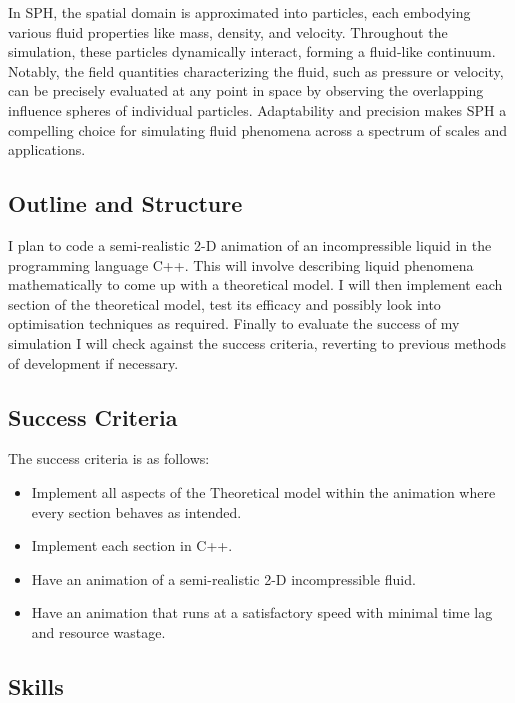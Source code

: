 \documentclass[a4paper,11pt]{article}
\begin{document}
\begin{multicols}{2}
In SPH, the spatial domain is approximated into particles, each embodying various fluid properties like mass, density, and velocity. Throughout the simulation, these particles dynamically interact, forming a fluid-like continuum. Notably, the field quantities characterizing the fluid, such as pressure or velocity, can be precisely evaluated at any point in space by observing the overlapping influence spheres of individual particles. Adaptability and precision makes SPH a compelling choice for simulating fluid phenomena across a spectrum of scales and applications.

\subsection{Outline and Structure}
I plan to code a semi-realistic 2-D animation of an incompressible liquid in the programming language C++. This will involve describing liquid phenomena mathematically to come up with a theoretical model. I will then implement each section of the theoretical model, test its efficacy and possibly look into optimisation techniques as required. Finally to evaluate the success of my simulation I will check against the success criteria, reverting to previous methods of development if necessary.

\subsection{Success Criteria}
The success criteria is as follows:
\begin{itemize}
 \item Implement all aspects of the Theoretical model within the animation where every section behaves as intended.
 \item Implement each section in C++.
 \item Have an animation of a semi-realistic 2-D incompressible fluid.
 \item Have an animation that runs at a satisfactory speed with minimal time lag and resource wastage.
\end{itemize}
\subsection{Skills}



\end{multicols}
\end{document}

